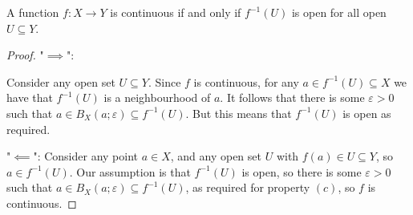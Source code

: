 \documentclass[10pt, a4paper]{article}
\begin{document}
\begin{proposition}
    A function $f : X \to Y$ is continuous if and only if $f ^ {-1}(U)$ is open for all open $U \subseteq Y$.

    \begin{proof}
        "$\implies$":

        Consider any open set $U \subseteq Y$.
        Since $f$ is continuous,
        for any $a \in f ^ {-1}(U) \subseteq X$ we have that $f ^ {-1}(U)$ is a neighbourhood of $a$.
        It follows that there is some $\varepsilon > 0$ such that $a \in B_{X}(a; \varepsilon) \subseteq f ^ {-1}(U)$.
        But this means that $f ^ {-1}(U)$ is open as required.

        "$\impliedby$":
        Consider any point $a \in X$,
        and any open set $U$ with $f(a) \in U \subseteq Y$,
        so $a \in f ^ {-1}(U)$.
        Our assumption is that $f ^ {-1}(U)$ is open,
        so there is some $\varepsilon > 0$ such that $a \in B_{X}(a; \varepsilon) \subseteq f ^ {-1}(U)$,
        as required for property $(c)$,
        so $f$ is continuous.
    \end{proof}
\end{proposition}
\end{document}
